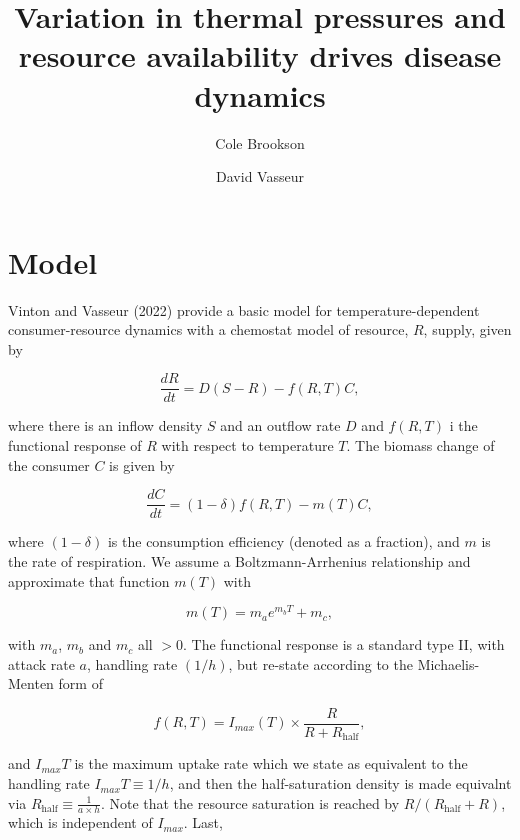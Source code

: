 \documentclass[
  letterpaper,
  DIV=11,
  numbers=noendperiod]{scrartcl}
\title{Variation in thermal pressures and resource availability drives
disease dynamics}
\author{Cole Brookson \and David Vasseur}
\date{}
\renewcommand*\contentsname{Table of contents}
\newcommand\contentsname{Table of contents}
\begin{document}
\maketitle

\renewcommand*\contentsname{Table of contents}
{
\hypersetup{linkcolor=}
\setcounter{tocdepth}{3}
\tableofcontents
}
\section{Model}\label{model}

Vinton and Vasseur (2022) provide a basic model for
temperature-dependent consumer-resource dynamics with a chemostat model
of resource, \(R\), supply, given by

\begin{equation}
\label{eq:resource-growth}
\frac{dR}{dt} = D(S-R) - f(R,T)C,
\end{equation}

where there is an inflow density \(S\) and an outflow rate \(D\) and
\(f(R,T)\) i the functional response of \(R\) with respect to
temperature \(T\). The biomass change of the consumer \(C\) is given by

\begin{equation}
\label{eq:consumer-growth}
\frac{dC}{dt} = (1 - \delta)f(R,T) - m(T)C,
\end{equation}

where \((1-\delta)\) is the consumption efficiency (denoted as a
fraction), and \(m\) is the rate of respiration. We assume a
Boltzmann-Arrhenius relationship and approximate that function \(m(T)\)
with

\begin{equation}
\label{eq:respiration-rate}
m(T) = m_ae^{m_bT} + m_c,
\end{equation}

with \(m_a\), \(m_b\) and \(m_c\) all \(>0\). The functional response is
a standard type II, with attack rate \(a\), handling rate \((1/h)\), but
re-state according to the Michaelis-Menten form of

\begin{equation}
\label{eq:functional-response}
f(R,T) = I_{max}(T) \times \frac{R}{R + R_{\text{half}}},
\end{equation}

and \(I_{max}T\) is the maximum uptake rate which we state as equivalent
to the handling rate \(I_{max}T \equiv 1/h\), and then the
half-saturation density is made equivalnt via
\(R_{\text{half}} \equiv \frac{1}{a \times h}\). Note that the resource
saturation is reached by \(R / (R_{\text{half}} + R)\), which is
independent of \(I_{max}\). Last,
\end{document}
